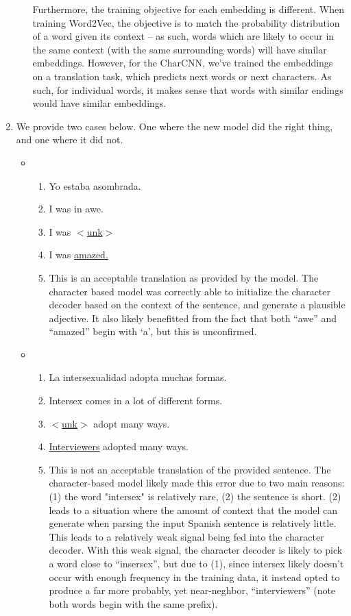 \documentclass[12pt]{article}
\begin{document}
\begin{enumerate}[label=(\alph*)]
\begin{enumerate}[label=(\roman*)]
      Furthermore, the training objective for each embedding is different. When training Word2Vec, the objective is to match the probability distribution of a word given its context -- as such, words which are likely to occur in the same context (with the same surrounding words) will have similar embeddings. However, for the CharCNN, we've trained the embeddings on a translation task, which predicts next words or next characters. As such, for individual words, it makes sense that words with similar endings would have similar embeddings.
    \end{enumerate}
  \item We provide two cases below. One where the new model did the right thing, and one where it did not.
    \begin{itemize}
      \item
        \begin{enumerate}[label=(\arabic*)]
          \item Yo estaba asombrada.
          \item I was in awe.
          \item I was \underline{$<$unk$>$}
          \item I was \underline{amazed.}
          \item This is an acceptable translation as provided by the model. The character based model was correctly able to initialize the character decoder based on the context of the sentence, and generate a plausible adjective. It also likely benefitted from the fact that both ``awe'' and ``amazed'' begin with `a', but this is unconfirmed.
        \end{enumerate}
      \item
        \begin{enumerate}[label=(\arabic*)]
          \item La intersexualidad adopta muchas formas.
          \item Intersex comes in a lot of different forms.
          \item \underline{$<$unk$>$} adopt many ways.
          \item \underline{Interviewers} adopted many ways.
          \item This is not an acceptable translation of the provided sentence. The character-based model likely made this error due to two main reasons: (1) the word "intersex" is relatively rare, (2) the sentence is short. (2) leads to a situation where the amount of context that the model can generate when parsing the input Spanish sentence is relatively little. This leads to a relatively weak signal being fed into the character decoder. With this weak signal, the character decoder is likely to pick a word close to ``insersex'', but due to (1), since intersex likely doesn't occur with enough frequency in the training data, it instead opted to produce a far more probably, yet near-neghbor, ``interviewers'' (note both words begin with the same prefix).
        \end{enumerate}
    \end{itemize}
\end{enumerate}
\end{document}
